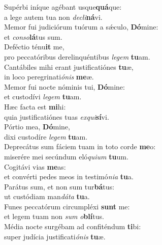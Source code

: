 \oddverse Supérbi iníque agébant usque\textbf{quá}que:~\*\\
\oddverse a lege autem tua non \textit{de}\textit{cli}\textbf{ná}vi.\\
\evenverse Memor fui judiciórum tuórum a sǽculo, \textbf{Dó}mine:~\*\\
\evenverse et \textit{con}\textit{so}\textbf{lá}tus sum.\\
\oddverse Deféctio ténu\textbf{it} me,~\*\\
\oddverse pro peccatóribus derelinquéntibus \textit{le}\textit{gem} \textbf{tu}am.\\
\evenverse Cantábiles mihi erant justificatiónes \textbf{tu}æ,~\*\\
\evenverse in loco peregrinati\textit{ó}\textit{nis} \textbf{me}æ.\\
\oddverse Memor fui nocte nóminis tui, \textbf{Dó}mine:~\*\\
\oddverse et custodívi \textit{le}\textit{gem} \textbf{tu}am.\\
\evenverse Hæc facta est \textbf{mi}hi:~\*\\
\evenverse quia justificatiónes tuas \textit{ex}\textit{qui}\textbf{sí}vi.\\
\oddverse Pórtio mea, \textbf{Dó}mine,~\*\\
\oddverse dixi custodíre \textit{le}\textit{gem} \textbf{tu}am.\\
\evenverse Deprecátus sum fáciem tuam in toto corde \textbf{me}o:~\*\\
\evenverse miserére mei secúndum eló\textit{qui}\textit{um} \textbf{tu}um.\\
\oddverse Cogitávi vias \textbf{me}as:~\*\\
\oddverse et convérti pedes meos in testimó\textit{ni}\textit{a} \textbf{tu}a.\\
\evenverse Parátus sum, et non sum tur\textbf{bá}tus:~\*\\
\evenverse ut custódiam man\textit{dá}\textit{ta} \textbf{tu}a.\\
\oddverse Funes peccatórum circumpléxi \textbf{sunt} me:~\*\\
\oddverse et legem tuam non \textit{sum} \textit{o}\textbf{blí}tus.\\
\evenverse Média nocte surgébam ad confiténdum \textbf{ti}bi:~\*\\
\evenverse super judícia justificati\textit{ó}\textit{nis} \textbf{tu}æ.\\
